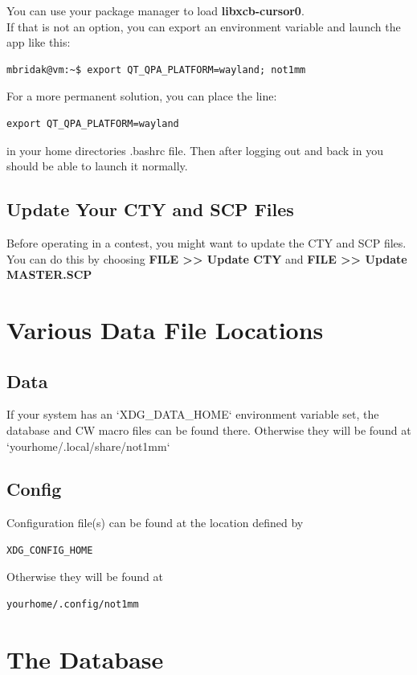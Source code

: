 \documentclass{article}
\begin{document}
You can use your package manager to load \textbf{libxcb-cursor0}.\\
If that is not an option, you can export an environment variable and launch the app like this:

\begin{verbatim}
mbridak@vm:~$ export QT_QPA_PLATFORM=wayland; not1mm
\end{verbatim}

For a more permanent solution, you can place the line:

\begin{verbatim}
export QT_QPA_PLATFORM=wayland
\end{verbatim}

in your home directories .bashrc file. Then after logging out and back in you should be able to launch it normally.

\subsection{Update Your CTY and SCP Files}

Before operating in a contest, you might want to update the CTY and SCP files. You can do this by choosing \textbf{FILE >> Update CTY} and \textbf{FILE >> Update MASTER.SCP}
\newpage
\section{Various Data File Locations}

\subsection{Data}

If your system has an `XDG\_DATA\_HOME` environment variable set, the database and CW macro files can be found there. Otherwise they will be found at `yourhome/.local/share/not1mm`

\subsection{Config}

Configuration file(s) can be found at the location defined by
\begin{verbatim}XDG_CONFIG_HOME\end{verbatim}
Otherwise they will be found at \begin{verbatim}yourhome/.config/not1mm\end{verbatim}
\section{The Database}
\end{document}

